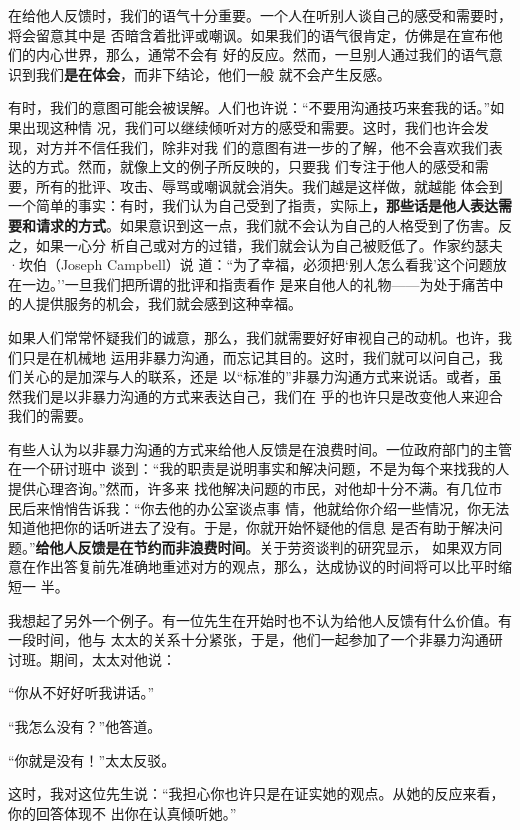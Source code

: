 \documentclass{ctexart}
\renewenvironment{quotation}{\setlength{\parskip}{0.5em}\setstretch{1.5}\kaishu\zihao{-5}\setlength{\parindent}{1em}}{\vspace{1em}}
\begin{document}
在给他人反馈时，我们的语气十分重要。一个人在听别人谈自己的感受和需要时，将会留意其中是
否暗含着批评或嘲讽。如果我们的语气很肯定，仿佛是在宣布他们的内心世界，那么，通常不会有
好的反应。然而，一旦别人通过我们的语气意识到我们\textbf{是在体会}，而非下结论，他们一般
就不会产生反感。

有时，我们的意图可能会被误解。人们也许说：``不要用沟通技巧来套我的话。''如果出现这种情
况，我们可以继续倾听对方的感受和需要。这时，我们也许会发现，对方并不信任我们，除非对我
们的意图有进一步的了解，他不会喜欢我们表达的方式。然而，就像上文的例子所反映的，只要我
们专注于他人的感受和需要，所有的批评、攻击、辱骂或嘲讽就会消失。我们越是这样做，就越能
体会到一个简单的事实：有时，我们认为自己受到了指责，实际上\textbf{，那些话是他人表达需
	要和请求的方式}。如果意识到这一点，我们就不会认为自己的人格受到了伤害。反之，如果一心分
析自己或对方的过错，我们就会认为自己被贬低了。作家约瑟夫·坎伯（Joseph Campbell）说
道：``为了幸福，必须把`别人怎么看我'这个问题放在一边。''一旦我们把所谓的批评和指责看作
是来自他人的礼物------为处于痛苦中的人提供服务的机会，我们就会感到这种幸福。

如果人们常常怀疑我们的诚意，那么，我们就需要好好审视自己的动机。也许，我们只是在机械地
运用非暴力沟通，而忘记其目的。这时，我们就可以问自己，我们关心的是加深与人的联系，还是
以``标准的''非暴力沟通方式来说话。或者，虽然我们是以非暴力沟通的方式来表达自己，我们在
乎的也许只是改变他人来迎合我们的需要。

有些人认为以非暴力沟通的方式来给他人反馈是在浪费时间。一位政府部门的主管在一个研讨班中
谈到：``我的职责是说明事实和解决问题，不是为每个来找我的人提供心理咨询。''然而，许多来
找他解决问题的市民，对他却十分不满。有几位市民后来悄悄告诉我：``你去他的办公室谈点事
情，他就给你介绍一些情况，你无法知道他把你的话听进去了没有。于是，你就开始怀疑他的信息
是否有助于解决问题。''\textbf{给他人反馈是在节约而非浪费时间}。关于劳资谈判的研究显示，
如果双方同意在作出答复前先准确地重述对方的观点，那么，达成协议的时间将可以比平时缩短一
半。

我想起了另外一个例子。有一位先生在开始时也不认为给他人反馈有什么价值。有一段时间，他与
太太的关系十分紧张，于是，他们一起参加了一个非暴力沟通研讨班。期间，太太对他说：


\begin{quotation}
	``你从不好好听我讲话。''

	``我怎么没有？''他答道。

	``你就是没有！''太太反驳。
\end{quotation}

这时，我对这位先生说：``我担心你也许只是在证实她的观点。从她的反应来看，你的回答体现不
出你在认真倾听她。''
\end{document}
